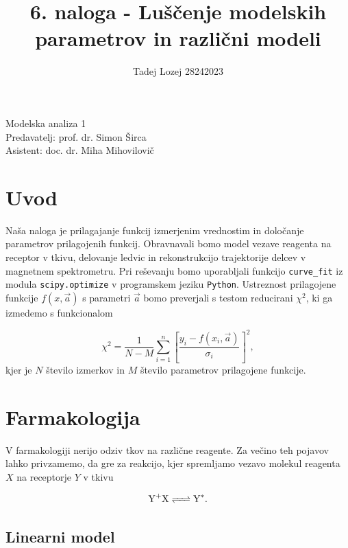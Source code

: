 \documentclass[slovene,11pt,a4paper]{article}
\begin{document}
\title{6. naloga - Luščenje modelskih parametrov in različni modeli}
\author{Tadej Lozej 28242023}
\maketitle
\begin{center}
Modelska analiza 1 \\
\bigskip
Predavatelj: prof. dr. Simon Širca \\
Asistent: doc. dr. Miha Mihovilovič
\end{center}

\newpage

\tableofcontents

\newpage

\section{Uvod}


Naša naloga je prilagajanje funkcij izmerjenim vrednostim in določanje parametrov prilagojenih funkcij. Obravnavali bomo model vezave reagenta na receptor v tkivu, delovanje ledvic in rekonstrukcijo trajektorije delcev v magnetnem spektrometru. Pri reševanju bomo uporabljali funkcijo \texttt{curve\_fit} iz modula \texttt{scipy.optimize} v programskem jeziku \texttt{Python}. Ustreznost prilagojene funkcije $f(x, \vec{a})$ s parametri $\vec{a}$ bomo preverjali s testom reducirani $\chi^2$, ki ga izmedemo s funkcionalom

\begin{equation}
\chi^2 = \frac{1}{N-M} \sum_{i=1}^n \left[
\frac{y_i - f(x_i, \vec{a})}{\sigma_i}
\right]^2,
\end{equation}
kjer je $N$ število izmerkov in $M$ število parametrov prilagojene funkcije.

\section{Farmakologija}

V farmakologiji nerijo odziv tkov na različne reagente. Za večino teh pojavov lahko privzamemo, da gre za reakcijo, kjer spremljamo vezavo molekul reagenta $X$ na receptorje $Y$ v tkivu

\begin{equation}
\ce{Y+X <=> Y^*}.
\end{equation}

\subsection{Linearni model}
\end{document}
